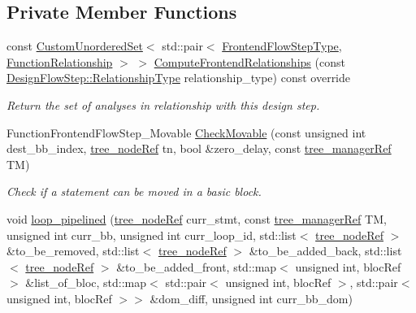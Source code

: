 \subsection*{Private Member Functions}
\begin{DoxyCompactItemize}
\item 
const \hyperlink{classCustomUnorderedSet}{Custom\+Unordered\+Set}$<$ std\+::pair$<$ \hyperlink{frontend__flow__step_8hpp_afeb3716c693d2b2e4ed3e6d04c3b63bb}{Frontend\+Flow\+Step\+Type}, \hyperlink{classFrontendFlowStep_af7cf30f2023e5b99e637dc2058289ab0}{Function\+Relationship} $>$ $>$ \hyperlink{classsimple__code__motion_a2d0ecf0878e4d4c20f186b0096faf490}{Compute\+Frontend\+Relationships} (const \hyperlink{classDesignFlowStep_a723a3baf19ff2ceb77bc13e099d0b1b7}{Design\+Flow\+Step\+::\+Relationship\+Type} relationship\+\_\+type) const override
\begin{DoxyCompactList}\small\item\em Return the set of analyses in relationship with this design step. \end{DoxyCompactList}\item 
Function\+Frontend\+Flow\+Step\+\_\+\+Movable \hyperlink{classsimple__code__motion_a69d1855a3f8ec2bcb43e9d63bc923961}{Check\+Movable} (const unsigned int dest\+\_\+bb\+\_\+index, \hyperlink{tree__node_8hpp_a6ee377554d1c4871ad66a337eaa67fd5}{tree\+\_\+node\+Ref} tn, bool \&zero\+\_\+delay, const \hyperlink{tree__manager_8hpp_a96ff150c071ce11a9a7a1e40590f205e}{tree\+\_\+manager\+Ref} TM)
\begin{DoxyCompactList}\small\item\em Check if a statement can be moved in a basic block. \end{DoxyCompactList}\item 
void \hyperlink{classsimple__code__motion_a639c97e219cb7d49b9cb451b5085d3bb}{loop\+\_\+pipelined} (\hyperlink{tree__node_8hpp_a6ee377554d1c4871ad66a337eaa67fd5}{tree\+\_\+node\+Ref} curr\+\_\+stmt, const \hyperlink{tree__manager_8hpp_a96ff150c071ce11a9a7a1e40590f205e}{tree\+\_\+manager\+Ref} TM, unsigned int curr\+\_\+bb, unsigned int curr\+\_\+loop\+\_\+id, std\+::list$<$ \hyperlink{tree__node_8hpp_a6ee377554d1c4871ad66a337eaa67fd5}{tree\+\_\+node\+Ref} $>$ \&to\+\_\+be\+\_\+removed, std\+::list$<$ \hyperlink{tree__node_8hpp_a6ee377554d1c4871ad66a337eaa67fd5}{tree\+\_\+node\+Ref} $>$ \&to\+\_\+be\+\_\+added\+\_\+back, std\+::list$<$ \hyperlink{tree__node_8hpp_a6ee377554d1c4871ad66a337eaa67fd5}{tree\+\_\+node\+Ref} $>$ \&to\+\_\+be\+\_\+added\+\_\+front, std\+::map$<$ unsigned int, bloc\+Ref $>$ \&list\+\_\+of\+\_\+bloc, std\+::map$<$ std\+::pair$<$ unsigned int, bloc\+Ref $>$, std\+::pair$<$ unsigned int, bloc\+Ref $>$$>$ \&dom\+\_\+diff, unsigned int curr\+\_\+bb\+\_\+dom)
\end{DoxyCompactItemize}
